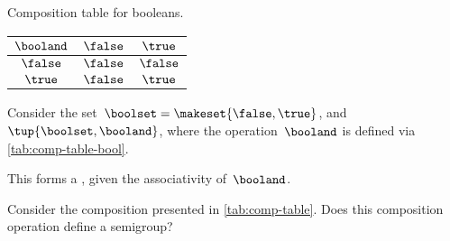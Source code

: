 \begin{margintable}
    \caption{Composition table for booleans.}
    \label{tab:comp-table-bool}
    \centering
    \begin{tabular}{c|cc}
        $\booland$ & $\false$ & $\true$ \\
        \hline
        $\false$   & $\false$ & $\false$ \\
        $\true$    & $\false$ & $\true$
    \end{tabular}
\end{margintable}

\begin{example}[Booleans]
    \label{exa:booleans-table}
    \label{ex:bool_semigroup}
    Consider the set~$\boolset=\makeset{\false, \true}$, and~$\tup{\boolset,\booland}$, where the operation~$\booland$ is defined via \cref{tab:comp-table-bool}.

    This forms a , given the associativity of~$\booland$.
\end{example}

\begin{gradedexercise}
    \label{ex:CompositionTable}
    Consider the composition presented in \cref{tab:comp-table}.
    Does this composition operation define a semigroup?
\end{gradedexercise}

